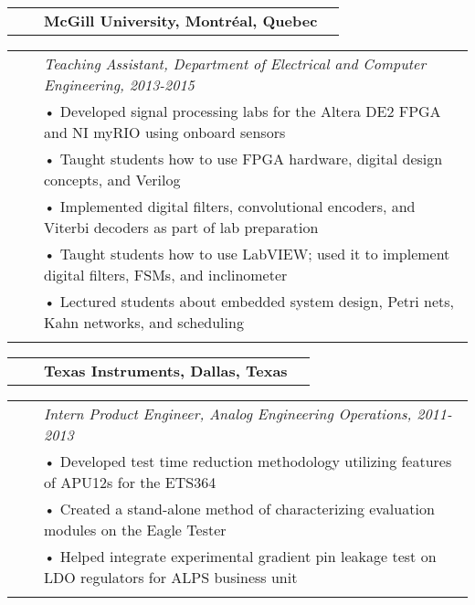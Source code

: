 \documentclass{minimal}
\begin{document}
\begin{tabular}{ p{1.5cm} p{1cm} p{10cm} >{\raggedleft\arraybackslash}p{3cm} }
& & \textbf{McGill University, Montréal, Quebec} & \\
\end{tabular}

\begin{tabular}{ p{1.5cm} p{1cm} p{16cm} }
& & \textit{Teaching Assistant, Department of Electrical and Computer Engineering, 2013-2015}\\
& & • Developed signal processing labs for the Altera DE2 FPGA and NI myRIO using onboard sensors\\
& & • Taught students how to use FPGA hardware, digital design concepts, and Verilog\\
& & • Implemented digital filters, convolutional encoders, and Viterbi decoders as part of lab preparation\\
& & • Taught students how to use LabVIEW; used it to implement digital filters, FSMs, and inclinometer\\
& & • Lectured students about embedded system design, Petri nets, Kahn networks, and scheduling\\
& & \\
\end{tabular}

\pagebreak

\begin{tabular}{ p{1.5cm} p{1cm} p{10cm} >{\raggedleft\arraybackslash}p{3cm} }
& & \textbf{Texas Instruments, Dallas, Texas} & \\
\end{tabular}

\begin{tabular}{ p{1.5cm} p{1cm} p{16cm} }
& & \textit{Intern Product Engineer, Analog Engineering Operations, 2011-2013}\\
& & • Developed test time reduction methodology utilizing features of APU12s for the ETS364\\
& & • Created a stand-alone method of characterizing evaluation modules on the Eagle Tester\\
& & • Helped integrate experimental gradient pin leakage test on LDO regulators for ALPS business unit\\
& & \\
\end{tabular}
\end{document}
